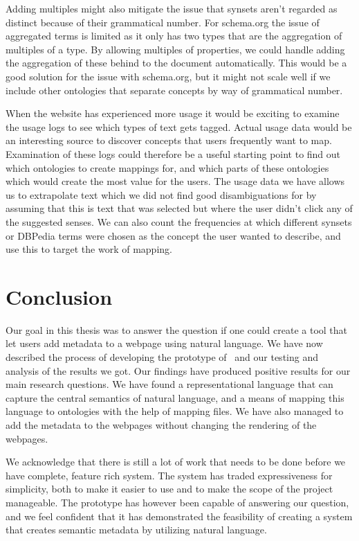 Adding multiples might also mitigate the issue that synsets aren't regarded as distinct because of their grammatical number.
For schema.org the issue of aggregated terms is limited as it only has two types that are the aggregation of multiples of a type.
By allowing multiples of properties, we could handle adding the aggregation of these behind to the document automatically.
This would be a good solution for the issue with schema.org, but it might not scale well if we include other ontologies
that separate concepts by way of grammatical number.

When the website has experienced more usage it would be exciting to examine the usage logs to see which types of text gets tagged.
Actual usage data would be an interesting source to discover concepts that users frequently want to map.
Examination of these logs could therefore be a useful starting point to find out which ontologies to create mappings for,
and which parts of these ontologies which would create the most value for the users.
The usage data we have allows us to extrapolate text which we did not find good disambiguations for
by assuming that this is text that was selected but where the user didn't click any of the suggested senses.
We can also count the frequencies at which different synsets or DBPedia terms were chosen as the concept the
user wanted to describe, and use this to target the work of mapping.

\section{Conclusion}
Our goal in this thesis was to answer the question if one could create a tool that let users add metadata to a webpage using
natural language.
We have now described the process of developing the prototype of \theartefact\ and our testing and analysis of the results we got.
Our findings have produced positive results for our main research questions.
We have found a representational language that can capture the central semantics of natural language,
and a means of mapping this language to ontologies with the help of mapping files.
We have also managed to add the metadata to the webpages without changing the rendering of the webpages.

We acknowledge that there is still a lot of work that needs to be done before we have complete, feature rich system.
The system has traded expressiveness for simplicity, both to make it easier to use and to make the scope of the project manageable.
The prototype has however been capable of answering our question,
and we feel confident that it has demonstrated the feasibility of creating a system that creates semantic metadata by
utilizing natural language.

